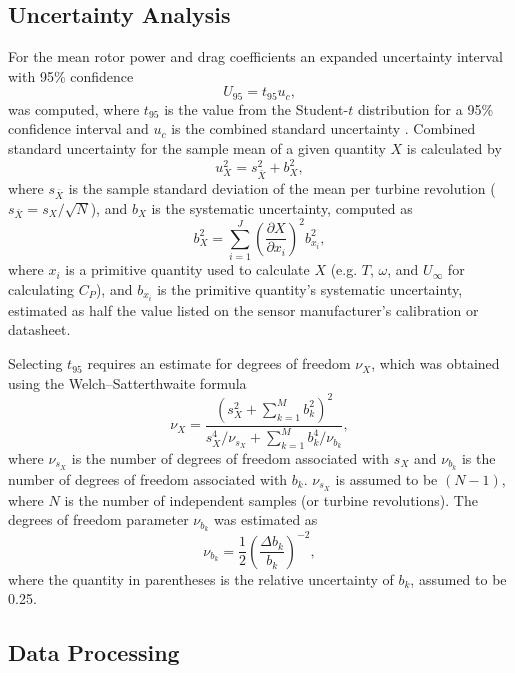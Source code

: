 \documentclass[10pt,letterpaper]{article}
\begin{document}
\subsection*{Uncertainty Analysis}

For the mean rotor power and drag coefficients an expanded uncertainty interval
with 95\% confidence
\begin{equation}
    U_{95} = t_{95} u_c,
\end{equation}
was computed, where $t_{95}$ is the value from the Student-$t$ distribution for
a 95\% confidence interval and $u_c$ is the combined standard uncertainty
\cite{ColemanSteele}. Combined standard uncertainty for the sample mean of a
given quantity $X$ is calculated by
\begin{equation}
    u_X^2 = s_{\bar{X}}^2 + b_X^2,
\end{equation}
where $s_{\bar{X}}$ is the sample standard deviation of the mean per turbine
revolution ($s_{\bar{X}} = s_X/\sqrt{N}$), and $b_X$ is the systematic
uncertainty, computed as
\begin{equation}
    b_{X}^2 = \sum_{i=1}^J \left( \frac{\partial X}{\partial x_i} \right)^2
    b_{x_i}^2,
\end{equation}
where $x_i$ is a primitive quantity used to calculate $X$ (e.g. $T$, $\omega$,
and $U_\infty$ for calculating $C_P$), and $b_{x_i}$ is the primitive quantity's
systematic uncertainty, estimated as half the value listed on the sensor
manufacturer's calibration or datasheet.

Selecting $t_{95}$ requires an estimate for degrees of freedom $\nu_X$, which
was obtained using the Welch--Satterthwaite formula
\begin{equation}
    \nu_X = \frac{\left(s_X^2 + \sum_{k=1}^M b_k^2 \right)^2} {s_X^4/\nu_{s_X} +
    \sum_{k=1}^M b_k^4/\nu_{b_k}},
\end{equation}
where $\nu_{s_X}$ is the number of degrees of freedom associated with $s_X$ and
$\nu_{b_k}$ is the number of degrees of freedom associated with $b_k$.
$\nu_{s_X}$ is assumed to be $(N-1)$, where $N$ is the number of independent
samples (or turbine revolutions). The degrees of freedom parameter $\nu_{b_k}$
was estimated as
\begin{equation}
    \nu_{b_k} = \frac{1}{2} \left( \frac{\Delta b_k}{b_k} \right)^{-2},
\end{equation}
where the quantity in parentheses is the relative uncertainty of $b_k$, assumed
to be 0.25.


\subsection*{Data Processing}
\end{document}
